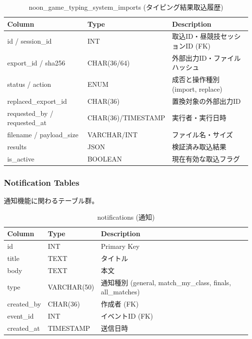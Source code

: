 \documentclass[paper=a4, fontsize=11pt]{jlreq}
\begin{document}
\begin{table}[H]
    \centering
    \caption{noon\_game\_typing\_system\_imports (タイピング結果取込履歴)}
    \begin{tabularx}{\textwidth}{|l|l|X|}
        \toprule
        Column & Type & Description \\
        \midrule
        id / session\_id & INT & 取込ID・昼競技セッションID (FK) \\
        export\_id / sha256 & CHAR(36/64) & 外部出力ID・ファイルハッシュ \\
        status / action & ENUM & 成否と操作種別 (import, replace) \\
        replaced\_export\_id & CHAR(36) & 置換対象の外部出力ID \\
        requested\_by / requested\_at & CHAR(36)/TIMESTAMP & 実行者・実行日時 \\
        filename / payload\_size & VARCHAR/INT & ファイル名・サイズ \\
        results & JSON & 検証済み取込結果 \\
        is\_active & BOOLEAN & 現在有効な取込フラグ \\
        \bottomrule
    \end{tabularx}
\end{table}

\subsubsection{Notification Tables}
通知機能に関わるテーブル群。

\begin{table}[H]
    \centering
    \caption{notifications (通知)}
    \begin{tabularx}{\textwidth}{|l|l|X|}
        \toprule
        Column & Type & Description \\
        \midrule
        id & INT & Primary Key \\
        title & TEXT & タイトル \\
        body & TEXT & 本文 \\
        type & VARCHAR(50) & 通知種別 (general, match\_my\_class, finals, all\_matches) \\
        created\_by & CHAR(36) & 作成者 (FK) \\
        event\_id & INT & イベントID (FK) \\
        created\_at & TIMESTAMP & 送信日時 \\
        \bottomrule
    \end{tabularx}
\end{table}
\end{document}
